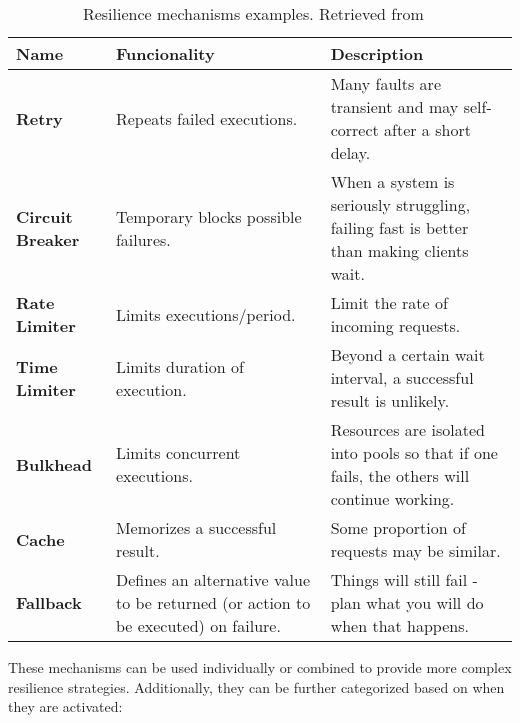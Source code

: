 \begin{table}[!htb]
    \centering
    \caption{Resilience mechanisms examples.
    Retrieved from ~\cite{resilience4j}}
    \label{tab:resilience-patterns}
    \vspace{0.3cm}
    \begin{tabular}{|l|p{6cm}|p{6cm}|}
        \hline
        \textbf{Name}            & \textbf{Funcionality}                                                              & \textbf{Description}                                                                      \\ \hline
        \textbf{Retry}           & Repeats failed executions.                                                         & Many faults are transient and may self-correct after a short delay.                       \\ \hline
        \textbf{Circuit Breaker} & Temporary blocks possible failures.                                                & When a system is seriously struggling, failing fast is better than making clients wait.   \\ \hline
        \textbf{Rate Limiter}    & Limits executions/period.                                                          & Limit the rate of incoming requests.                                                      \\ \hline
        \textbf{Time Limiter}    & Limits duration of execution.                                                      & Beyond a certain wait interval, a successful result is unlikely.                          \\ \hline
        \textbf{Bulkhead}        & Limits concurrent executions.                                                      & Resources are isolated into pools so that if one fails, the others will continue working. \\ \hline
        \textbf{Cache}           & Memorizes a successful result.                                                     & Some proportion of requests may be similar.                                               \\ \hline
        \textbf{Fallback}        & Defines an alternative value to be returned (or action to be executed) on failure. & Things will still fail - plan what you will do when that happens. \\ \hline
    \end{tabular}
\end{table}

These mechanisms can be used individually or combined to provide more complex resilience strategies.
Additionally, they can be further categorized based on when they are activated:

